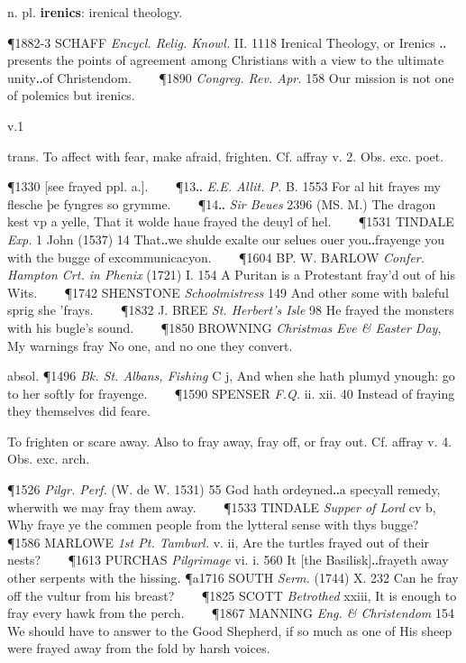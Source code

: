 \begin{description}[wide, labelwidth=!, labelindent=0pt]
\begin{myenumerate}
 n. pl. \textbf{irenics}: irenical theology.

\P 1882-3 SCHAFF \textit{Encycl. Relig. Knowl.} II. 1118 Irenical  Theology, or Irenics ‥ presents the points of agreement among Christians with a view to the ultimate unity‥of Christendom.    
\P 1890 \textit{Congreg.  Rev. Apr.} 158 Our mission is not one of polemics but irenics.
\end{myenumerate}


 v.1

\noindent {}

\vspace{-0.3cm}

\begin{myenumerate}

 trans. To affect with fear, make afraid, frighten. Cf. affray v. 2. Obs. exc. poet.

\P 1330 [see frayed ppl. a.].    
\P 13‥ \textit{E.E. Allit. P.} B. 1553 For  al hit frayes my flesche þe fyngres so grymme.    
\P 14‥ \textit{Sir Beues} 2396 (MS. M.) The dragon kest vp a yelle, That it wolde haue frayed the deuyl of hel.    
\P 1531 TINDALE  \textit{Exp.} 1 John (1537) 14 That‥we shulde exalte our selues ouer you‥frayenge you with the bugge of excommunicacyon.    
\P 1604 BP. W. BARLOW  \textit{Confer. Hampton Crt. in Phenix} (1721) I. 154 A Puritan is a Protestant fray'd out of his Wits.    
\P 1742 SHENSTONE  \textit{Schoolmistress} 149 And other some with baleful sprig she 'frays.    
\P 1832 J. BREE  \textit{St. Herbert's Isle} 98 He frayed the monsters with his bugle's sound.    
\P 1850 BROWNING  \textit{Christmas Eve \& Easter Day}, My warnings fray No one, and no one they convert.

\noindent absol. \P 1496  \textit{Bk. St. Albans, Fishing} C j, And when she hath plumyd ynough: go to her softly for frayenge.    
\P 1590 SPENSER  \textit{F.Q.} ii. xii. 40 Instead of fraying they themselves did feare.

 To frighten or scare away. Also to fray away, fray off, or fray out. Cf. affray v. 4. Obs. exc. arch.

\P 1526  \textit{Pilgr. Perf.} (W. de W. 1531) 55 God hath ordeyned‥a specyall remedy, wherwith we may fray them away.    
\P 1533 TINDALE  \textit{Supper of Lord} cv b, Why fraye ye the commen people from the lytteral sense with thys bugge?    
\P 1586 MARLOWE  \textit{1st Pt. Tamburl.} v. ii, Are the turtles frayed out of their nests?    
\P 1613 PURCHAS  \textit{Pilgrimage} vi. i. 560 It [the Basilisk]‥frayeth away other serpents with the hissing.
\P a1716 SOUTH  \textit{Serm.} (1744) X. 232 Can he fray off the vultur from his breast?    
\P 1825 SCOTT  \textit{Betrothed} xxiii, It is enough to fray every hawk from the perch.    
\P 1867 MANNING  \textit{Eng. \& Christendom} 154 We should have to answer to the Good Shepherd, if so much as one of His sheep were frayed away from the fold by harsh voices.


\end{myenumerate}
\end{description}
